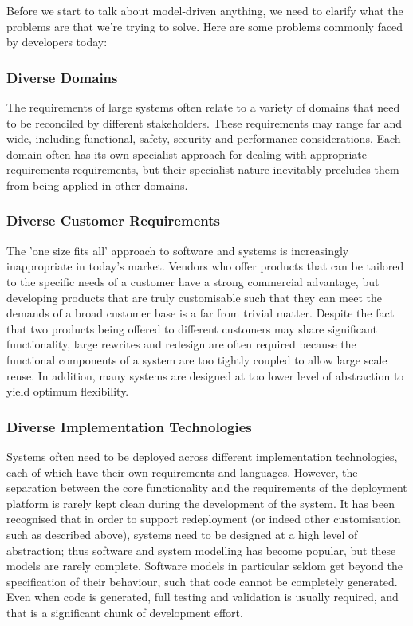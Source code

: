 Before we start to talk about model-driven anything, we need to clarify what the problems are that we're trying to solve. Here are some problems commonly faced by developers today:

\subsubsection{Diverse Domains}

The requirements of large systems often relate to a variety of domains that need to be reconciled by different stakeholders. These requirements may range far and wide, including functional, safety, security and performance considerations. Each domain often has its own specialist approach for dealing with appropriate requirements requirements, but their specialist nature inevitably precludes them from being applied in other domains.

\subsubsection{Diverse Customer Requirements}

The 'one size fits all' approach to software and systems is increasingly inappropriate in today's market. Vendors who offer products that can be tailored to the specific needs of a customer have a strong commercial advantage, but developing products that are truly customisable such that they can meet the demands of a broad customer base is a far from trivial matter. Despite the fact that two products being offered to different customers may share significant functionality, large rewrites and redesign are often required because the functional components of a system are too tightly coupled to allow large scale reuse. In addition, many systems are designed at too lower level of abstraction to yield optimum flexibility.

\subsubsection{Diverse Implementation Technologies}

Systems often need to be deployed across different implementation technologies, each of which have their own requirements and languages. However, the separation between the core functionality and the requirements of the deployment platform is rarely kept clean during the development of the system. It has been recognised that in order to support redeployment (or indeed other customisation such as described above), systems need to be designed at a high level of abstraction; thus software and system modelling has become popular, but these models are rarely complete. Software models in particular seldom get beyond the specification of their behaviour, such that code cannot be completely generated. Even when code is generated, full testing and validation is usually required, and that is a significant chunk of development effort.

